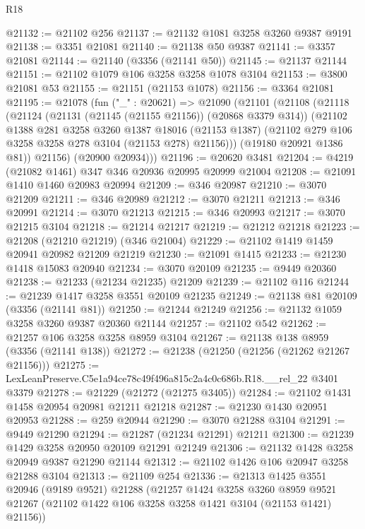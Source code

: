 \begin{lexlean}{R18}
\begin{coremodule}
@21132 := @21102 @256
@21137 := @21132 @1081 @3258 @3260 @9387 @9191
@21138 := @3351 @21081
@21140 := @21138 @50 @9387
@21141 := @3357 @21081
@21144 := @21140 (@3356 (@21141 @50))
@21145 := @21137 @21144
@21151 := @21102 @1079 @106 @3258 @3258 @1078 @3104
@21153 := @3800 @21081 @53
@21155 := @21151 (@21153 @1078)
@21156 := @3364 @21081
@21195 := @21078
    (fun ("_" : @20621) =>
    @21090
      (@21101
        (@21108
          (@21118
            (@21124
              (@21131 (@21145 (@21155 @21156)) (@20868 @3379 @314))
              (@21102
                @1388
                @281
                @3258
                @3260
                @1387
                @18016
                (@21153 @1387)
                (@21102 @279 @106 @3258 @3258 @278 @3104 (@21153 @278) @21156)))
            (@19180 @20921 @1386 @81))
          @21156)
        (@20900 @20934)))
@21196 := @20620 @3481
@21204 := @4219 (@21082 @1461) @347 @346 @20936 @20995 @20999 @21004
@21208 := @21091 @1410 @1460 @20983 @20994
@21209 := @346 @20987
@21210 := @3070 @21209
@21211 := @346 @20989
@21212 := @3070 @21211
@21213 := @346 @20991
@21214 := @3070 @21213
@21215 := @346 @20993
@21217 := @3070 @21215 @3104
@21218 := @21214 @21217
@21219 := @21212 @21218
@21223 := @21208 (@21210 @21219) (@346 @21004)
@21229 := @21102 @1419 @1459 @20941 @20982 @21209 @21219
@21230 := @21091 @1415
@21233 := @21230 @1418 @15083 @20940
@21234 := @3070 @20109
@21235 := @9449 @20360
@21238 := @21233 (@21234 @21235) @21209
@21239 := @21102 @116
@21244 := @21239 @1417 @3258 @3551 @20109 @21235
@21249 := @21138 @81 @20109 (@3356 (@21141 @81))
@21250 := @21244 @21249
@21256 := @21132 @1059 @3258 @3260 @9387 @20360 @21144
@21257 := @21102 @542
@21262 := @21257 @106 @3258 @3258 @8959 @3104
@21267 := @21138 @138 @8959 (@3356 (@21141 @138))
@21272 := @21238 (@21250 (@21256 (@21262 @21267 @21156)))
@21275 := LexLeanPreserve.C5e1a94ce78c49f496a815c2a4c0c686b.R18.__rel_22 @3401 @3379
@21278 := @21229 (@21272 (@21275 @3405))
@21284 := @21102 @1431 @1458 @20954 @20981 @21211 @21218
@21287 := @21230 @1430 @20951 @20953
@21288 := @259 @20944
@21290 := @3070 @21288 @3104
@21291 := @9449 @21290
@21294 := @21287 (@21234 @21291) @21211
@21300 := @21239 @1429 @3258 @20950 @20109 @21291 @21249
@21306 := @21132 @1428 @3258 @20949 @9387 @21290 @21144
@21312 := @21102 @1426 @106 @20947 @3258 @21288 @3104
@21313 := @21109 @254
@21336 := @21313
    @1425
    @3551
    @20946
    (@9189 @9521)
    @21288
    (@21257
      @1424
      @3258
      @3260
      @8959
      @9521
      @21267
      (@21102 @1422 @106 @3258 @3258 @1421 @3104 (@21153 @1421) @21156))

\end{coremodule}
\end{lexlean}
